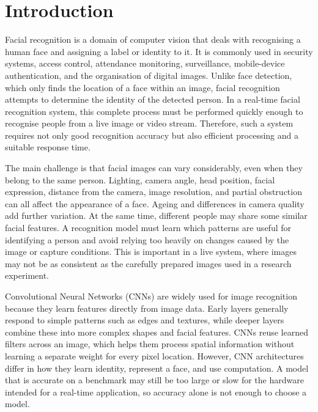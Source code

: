 \documentclass[11pt,a4paper,twocolumn]{article}
\begin{document}

\section{Introduction}

Facial recognition is a domain of computer vision that deals with recognising a human face and assigning a label or identity to it. It is commonly used in security systems, access control, attendance monitoring, surveillance, mobile-device authentication, and the organisation of digital images. Unlike face detection, which only finds the location of a face within an image, facial recognition attempts to determine the identity of the detected person. In a real-time facial recognition system, this complete process must be performed quickly enough to recognise people from a live image or video stream. Therefore, such a system requires not only good recognition accuracy but also efficient processing and a suitable response time.

The main challenge is that facial images can vary considerably, even when they belong to the same person. Lighting, camera angle, head position, facial expression, distance from the camera, image resolution, and partial obstruction can all affect the appearance of a face. Ageing and differences in camera quality add further variation. At the same time, different people may share some similar facial features. A recognition model must learn which patterns are useful for identifying a person and avoid relying too heavily on changes caused by the image or capture conditions. This is important in a live system, where images may not be as consistent as the carefully prepared images used in a research experiment.

Convolutional Neural Networks (CNNs) are widely used for image recognition because they learn features directly from image data. Early layers generally respond to simple patterns such as edges and textures, while deeper layers combine these into more complex shapes and facial features. CNNs reuse learned filters across an image, which helps them process spatial information without learning a separate weight for every pixel location. However, CNN architectures differ in how they learn identity, represent a face, and use computation. A model that is accurate on a benchmark may still be too large or slow for the hardware intended for a real-time application, so accuracy alone is not enough to choose a model.
\end{document}
